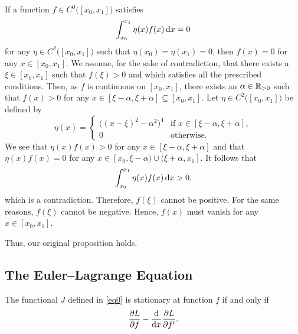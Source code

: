   If a function \(f \in C^0\big([x_0, x_1]\big)\) satisfies
  \[
    \int_{x_0}^{x_1} \eta(x) f(x) \mathop{}\!\mathrm{d} x = 0
  \]
  for any \(\eta \in C^2\big([x_0, x_1]\big)\) such that \(\eta(x_0) = \eta(x_1) = 0\), then \(f(x) = 0\) for any
  \(x \in [x_0, x_1]\).
\Elm
\Bpr
  We assume, for the sake of contradiction, that there exists a \(\xi \in [x_0, x_1]\) such that \(f(\xi) > 0\) and
  which satisfies all the prescribed conditions. Then, as \(f\) is continuous on \([x_0, x_1]\), there exists an
  \(\alpha \in \mathbb{R}_{>0}\) such that \(f(x) > 0\) for any \(x \in [\xi - \alpha, \xi + \alpha] \subseteq [x_0, x_1]\).
  Let \(\eta \in C^2\big([x_0, x_1]\big)\) be defined by
  \[
    \eta(x) = \begin{cases}
      \big((x - \xi)^2 - \alpha^2\big)^4 & \text{if } x \in [\xi - \alpha, \xi + \alpha],\\
      0 & \text{otherwise}.
    \end{cases}
  \]
  We see that \(\eta(x) f(x) > 0\) for any \(x \in [\xi - \alpha, \xi + \alpha]\) and that \(\eta(x) f(x) = 0\) for any
  \(x \in [x_0, \xi - \alpha) \cup (\xi + \alpha, x_1]\). It follows that
  \[
    \int_{x_0}^{x_1} \eta(x) f(x) \mathop{}\!\mathrm{d} x > 0,
  \]
  which is a contradiction. Therefore, \(f(\xi)\) cannot be positive. For the same reasons, \(f(\xi)\) cannot be
  negative. Hence, \(f(x)\) must vanish for any \(x \in [x_0, x_1]\).

  Thus, our original proposition holds.
\Epr

\subsection{The Euler--Lagrange Equation}

  The functional \(J\) defined in \eqref{eq0} is stationary at function \(f\) if and only if
  \[
    \frac{\partial L}{\partial f} - \frac{\mathop{}\!\mathrm{d}}{\mathop{}\!\mathrm{d} x} \frac{\partial L}{\partial f'}.
  \]
\Eth

\Edc
